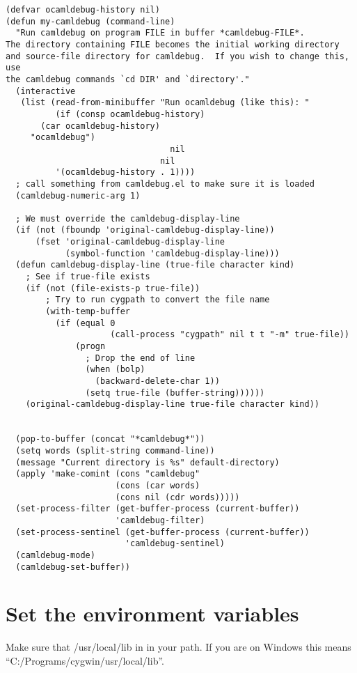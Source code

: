 \documentclass{article}
\begin{document}
\begin{verbatim}
(defvar ocamldebug-history nil)
(defun my-camldebug (command-line)
  "Run camldebug on program FILE in buffer *camldebug-FILE*.
The directory containing FILE becomes the initial working directory
and source-file directory for camldebug.  If you wish to change this, use
the camldebug commands `cd DIR' and `directory'."
  (interactive
   (list (read-from-minibuffer "Run ocamldebug (like this): "
          (if (consp ocamldebug-history)
       (car ocamldebug-history)
     "ocamldebug")
                                 nil
                               nil
          '(ocamldebug-history . 1))))
  ; call something from camldebug.el to make sure it is loaded
  (camldebug-numeric-arg 1)

  ; We must override the camldebug-display-line
  (if (not (fboundp 'original-camldebug-display-line))
      (fset 'original-camldebug-display-line 
            (symbol-function 'camldebug-display-line)))
  (defun camldebug-display-line (true-file character kind)
    ; See if true-file exists
    (if (not (file-exists-p true-file))
        ; Try to run cygpath to convert the file name
        (with-temp-buffer
          (if (equal 0 
                     (call-process "cygpath" nil t t "-m" true-file))
              (progn
                ; Drop the end of line
                (when (bolp)
                  (backward-delete-char 1))
                (setq true-file (buffer-string))))))
    (original-camldebug-display-line true-file character kind))


  (pop-to-buffer (concat "*camldebug*"))
  (setq words (split-string command-line)) 
  (message "Current directory is %s" default-directory)
  (apply 'make-comint (cons "camldebug"
                      (cons (car words)
                      (cons nil (cdr words)))))
  (set-process-filter (get-buffer-process (current-buffer))
                      'camldebug-filter)
  (set-process-sentinel (get-buffer-process (current-buffer))
                        'camldebug-sentinel)
  (camldebug-mode)
  (camldebug-set-buffer))
\end{verbatim}


\section{Set the environment variables}

 Make sure that /usr/local/lib in in your path. If you are on Windows this
 means ``C:/Programs/cygwin/usr/local/lib''. 
\end{document}
